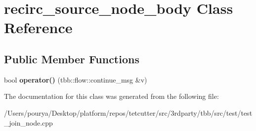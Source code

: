 \hypertarget{classrecirc__source__node__body}{}\section{recirc\+\_\+source\+\_\+node\+\_\+body Class Reference}
\label{classrecirc__source__node__body}
\subsection*{Public Member Functions}
\begin{DoxyCompactItemize}
\item 
\hypertarget{classrecirc__source__node__body_a074d786e4047f21f17db1c011e8c3c63}{}bool {\bfseries operator()} (tbb\+::flow\+::continue\+\_\+msg \&v)\label{classrecirc__source__node__body_a074d786e4047f21f17db1c011e8c3c63}

\end{DoxyCompactItemize}


The documentation for this class was generated from the following file\+:\begin{DoxyCompactItemize}
\item 
/\+Users/pourya/\+Desktop/platform/repos/tetcutter/src/3rdparty/tbb/src/test/test\+\_\+join\+\_\+node.\+cpp\end{DoxyCompactItemize}
